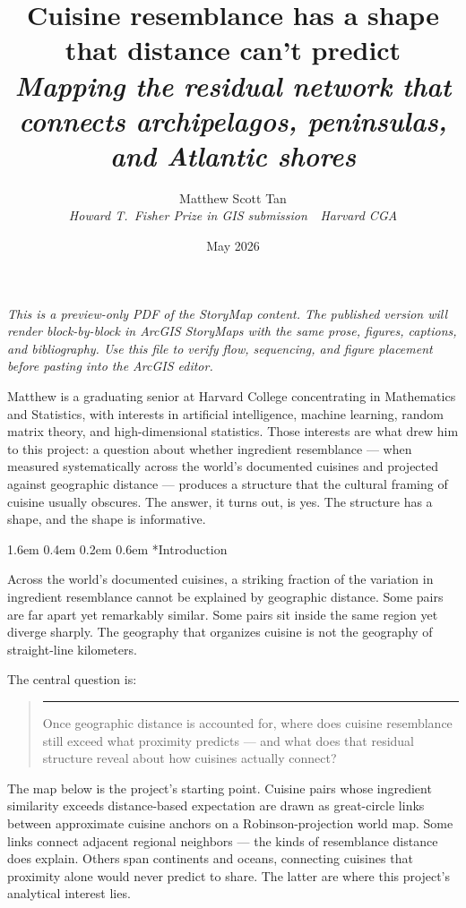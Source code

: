 \documentclass[11pt]{article}
\title{\vspace{-2em}\Huge\bfseries Cuisine resemblance has a shape\\ that distance can't predict\\[0.4em]
       \large\mdseries\itshape Mapping the residual network that connects archipelagos, peninsulas, and Atlantic shores}
\author{Matthew Scott Tan \\[0.4em]
        \normalsize\itshape Howard T.~Fisher Prize in GIS submission \,\textbullet\, Harvard CGA}
\date{May 2026}
\makeatletter
\renewcommand\section{\@startsection{section}{1}{\z@}%
  {1.6em \@plus 0.4em \@minus 0.2em}%
  {0.6em}%
  {\normalfont\Large\bfseries\color{black!85}}}
\newenvironment{pullquote}
  {\begin{quote}\itshape\color{black!72}\hspace*{-0.4em}\rule{2pt}{1em}\hspace{0.6em}}
  {\end{quote}}
\makeatother
\begin{document}
\maketitle

\noindent\textit{This is a preview-only PDF of the StoryMap content. The published version
will render block-by-block in ArcGIS StoryMaps with the same prose, figures, captions, and
bibliography. Use this file to verify flow, sequencing, and figure placement before pasting
into the ArcGIS editor.}

\vspace{1em}
\noindent\hrulefill


Matthew is a graduating senior at Harvard College concentrating in Mathematics and Statistics, with interests in artificial intelligence, machine learning, random matrix theory, and high-dimensional statistics. Those interests are what drew him to this project: a question about whether ingredient resemblance — when measured systematically across the world's documented cuisines and projected against geographic distance — produces a structure that the cultural framing of cuisine usually obscures. The answer, it turns out, is yes. The structure has a shape, and the shape is informative.


\section*{Introduction}


Across the world's documented cuisines, a striking fraction of the variation in ingredient resemblance cannot be explained by geographic distance. Some pairs are far apart yet remarkably similar. Some pairs sit inside the same region yet diverge sharply. The geography that organizes cuisine is not the geography of straight-line kilometers.


The central question is:


\begin{pullquote}
Once geographic distance is accounted for, where does cuisine resemblance still exceed what proximity predicts — and what does that residual structure reveal about how cuisines actually connect?
\end{pullquote}


The map below is the project's starting point. Cuisine pairs whose ingredient similarity exceeds distance-based expectation are drawn as great-circle links between approximate cuisine anchors on a Robinson-projection world map. Some links connect adjacent regional neighbors — the kinds of resemblance distance does explain. Others span continents and oceans, connecting cuisines that proximity alone would never predict to share. The latter are where this project's analytical interest lies.
\end{document}
